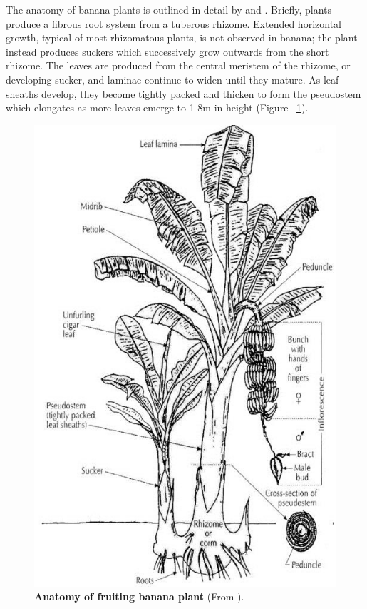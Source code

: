 The anatomy of banana plants is outlined in detail by \textcite{Bakry2009} and \textcite{Robinson2010}. Briefly, plants produce a fibrous root system from a tuberous rhizome. Extended horizontal growth, typical of most rhizomatous plants, is not observed in banana; the plant instead produces suckers which successively grow outwards from the short rhizome. The leaves are produced from the central meristem of the rhizome, or developing sucker, and laminae continue to widen until they mature. As leaf sheaths develop, they become tightly packed and thicken to form the pseudostem which elongates as more leaves emerge to 1-8m in height (Figure ~\ref{fig:Anatomy of fruiting banana plant}). 

\afterpage



\begin{figure}[hp!]
    \centering
    \includegraphics[width=12cm]{Figures/Diagrammatic-representation-of-a-fruiting-banana-plant-with-suckers-in-Bakry-et-al_W640.jpg}
    \caption[Anatomy of fruiting banana plant]{\textbf{Anatomy of fruiting banana plant} (From \parencite{Bakry2009}).}
    \label{fig:Anatomy of fruiting banana plant}
\end{figure}
\clearpage

